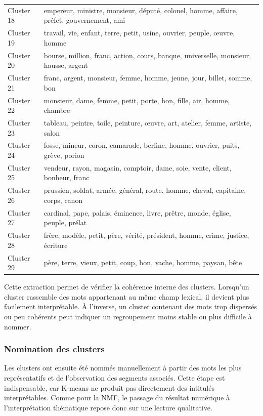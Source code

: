 \begin{longtable}{p{2cm}p{11.5cm}}
Cluster 18 & empereur, ministre, monsieur, député, colonel, homme, affaire, préfet, gouvernement, ami \\
Cluster 19 & travail, vie, enfant, terre, petit, usine, ouvrier, peuple, œuvre, homme \\
Cluster 20 & bourse, million, franc, action, cours, banque, universelle, monsieur, hausse, argent \\
Cluster 21 & franc, argent, monsieur, femme, homme, jeune, jour, billet, somme, bon \\
Cluster 22 & monsieur, dame, femme, petit, porte, bon, fille, air, homme, chambre \\
Cluster 23 & tableau, peintre, toile, peinture, œuvre, art, atelier, femme, artiste, salon \\
Cluster 24 & fosse, mineur, coron, camarade, berline, homme, ouvrier, puits, grève, porion \\
Cluster 25 & vendeur, rayon, magasin, comptoir, dame, soie, vente, client, bonheur, franc \\
Cluster 26 & prussien, soldat, armée, général, route, homme, cheval, capitaine, corps, canon \\
Cluster 27 & cardinal, pape, palais, éminence, livre, prêtre, monde, église, peuple, prélat \\
Cluster 28 & frère, modèle, petit, père, vérité, président, homme, crime, justice, écriture \\
Cluster 29 & père, terre, vieux, petit, coup, bon, vache, homme, paysan, bête \\
\bottomrule
\end{longtable}

Cette extraction permet de vérifier la cohérence interne des clusters. Lorsqu'un cluster rassemble des mots appartenant au même champ lexical, il devient plus facilement interprétable. À l'inverse, un cluster contenant des mots trop dispersés ou peu cohérents peut indiquer un regroupement moins stable ou plus difficile à nommer.

\subsubsection{Nomination des clusters}

Les clusters ont ensuite été nommés manuellement à partir des mots les plus représentatifs et de l'observation des segments associés. Cette étape est indispensable, car K-means ne produit pas directement des intitulés interprétables. Comme pour la NMF, le passage du résultat numérique à l'interprétation thématique repose donc sur une lecture qualitative.

